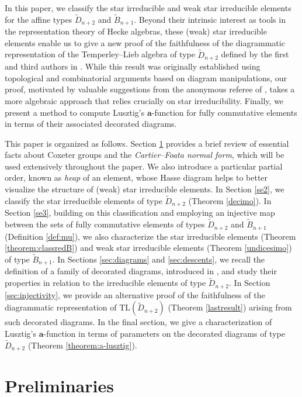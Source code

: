 \documentclass{amsart}
\newcommand{\D}{{\widetilde{D}_{n+2}}}
\newcommand{\B}{{\widetilde{B}_{n+1}}}
\newcommand{\tl}{{\mathrm{TL}}}
\newcommand{\ab}{\mathbf{a}}
\theoremstyle{definition}
\begin{document}
In this paper, we classify the star irreducible and weak star irreducible elements for the affine types $\D$ and $\B$. Beyond their intrinsic interest as tools in the representation theory of Hecke algebras, these (weak) star irreducible elements enable us to give a new proof of the faithfulness of the diagrammatic representation of the Temperley–Lieb algebra of type $\D$ defined by the first and third authors in \cite{BFS}. While this result was originally established using topological and combinatorial arguments based on diagram manipulations, our proof, motivated by valuable suggestions from the anonymous referee of \cite{BFS}, takes a more algebraic approach that relies crucially on star irreducibility. Finally, we present a method to compute Lusztig’s $\ab$-function \cite{lusztig_cells} for fully commutative elements in terms of their associated decorated diagrams.
\smallskip

This paper is organized as follows.  Section \ref{se1} provides a brief review of essential facts about Coxeter groups and the \textit{Cartier--Foata normal form}, which will be used extensively throughout the paper. We also introduce a particular partial order, known as \textit{heap} of an element, whose Hasse diagram helps to better visualize the structure of (weak) star irreducible elements.
In Section \ref{se2}, we classify the star irreducible elements of type $\D$ (Theorem \ref{decimo}). 
In Section \ref{se3}, building on this classification and employing an injective map between the sets of fully commutative elements of types $\D$ and $\B$ (Definition \ref{def:mu}), we also characterize the star irreducible elements (Theorem \ref{theorem:classredB}) and weak star irreducible elements (Theorem \ref{undicesimo}) of type $\B$. In Sections \ref{sec:diagrams} and \ref{sec:descents}, we recall the definition of a family of decorated diagrams, introduced in \cite{BFS}, and study their properties in relation to the irreducible elements of type $\D$. 
In Section \ref{sec:injectivity}, we provide an alternative proof of the faithfulness of the diagrammatic representation of $\tl(\D)$ (Theorem \ref{lastresult}) arising from such decorated diagrams. In the final section, we give a characterization of Lusztig's $\ab$-function in terms of parameters on the decorated diagrams of type $\D$ (Theorem \ref{theorem:a-lusztig}). 


\section{Preliminaries} \label{se1}
\end{document}
